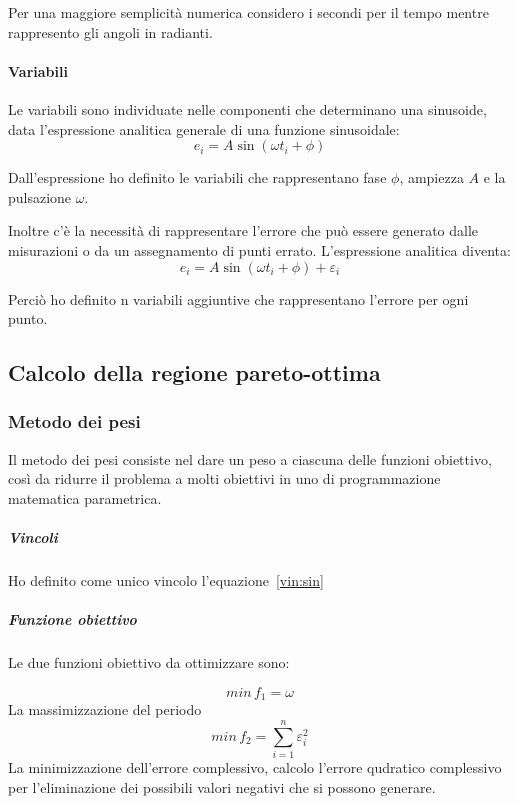 \documentclass[a4paper,12pt]{report}
\begin{document}
Per una maggiore semplicità numerica considero i secondi per il tempo mentre rappresento gli angoli in radianti.


\paragraph{Variabili}
Le variabili sono individuate nelle componenti che determinano una sinusoide, data l'espressione analitica generale di una funzione sinusoidale:
\begin{equation}
e_i = A\sin(\omega t_i + \phi)
\end{equation}

Dall'espressione ho definito le variabili che rappresentano fase $ \phi $, ampiezza $ A $  e la pulsazione $\omega$.

Inoltre c'è la necessità di rappresentare l'errore che può essere generato dalle misurazioni o da un assegnamento di punti errato. L'espressione analitica diventa:
\begin{equation}
\label{vin:sin}
e_i = A\sin(\omega t_i + \phi) + \varepsilon_i
\end{equation}

Perciò ho definito n variabili aggiuntive che rappresentano l'errore per ogni punto.
\subsection{Calcolo della regione pareto-ottima}

\subsubsection{Metodo dei pesi}
Il metodo dei pesi consiste nel dare un peso a ciascuna delle funzioni obiettivo, così da ridurre il problema a molti obiettivi in uno di programmazione matematica parametrica.

\subparagraph{Vincoli}
Ho definito come unico vincolo l'equazione~\eqref{vin:sin}

\subparagraph{Funzione obiettivo}
Le due funzioni obiettivo da ottimizzare sono:

\begin{equation}
\label{fo:periodo}
min \, f_1 = \omega
\end{equation}
La massimizzazione del periodo
\begin{equation}
\label{fo:errore}
min \, f_2 = \sum_{i=1}^n \varepsilon_i^2
\end{equation}
La minimizzazione dell'errore complessivo, calcolo l'errore qudratico complessivo per l'eliminazione dei possibili valori negativi che si possono generare.
\end{document}
